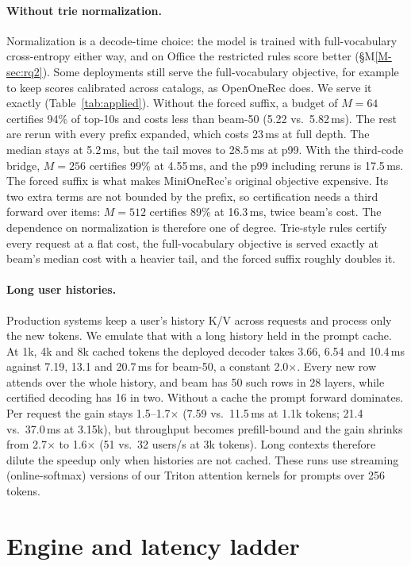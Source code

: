 \documentclass[sigconf,anonymous]{acmart}
\begin{document}
\paragraph{Without trie normalization.} Normalization is a decode-time choice: the model is trained with
full-vocabulary cross-entropy either way, and on Office the restricted rules score better
(\S M\ref{M-sec:rq2}). Some deployments still serve the full-vocabulary objective, for example to keep scores
calibrated across catalogs, as OpenOneRec does. We serve it exactly (Table~\ref{tab:applied}). Without the forced
suffix, a budget of $M=64$ certifies 94\% of top-10s and costs less than beam-50 (5.22 vs.\ 5.82\,ms). The rest are
rerun with every prefix expanded, which costs 23\,ms at full depth. The median stays at 5.2\,ms, but the tail moves
to 28.5\,ms at p99. With the third-code bridge, $M=256$ certifies 99\% at 4.55\,ms, and the p99 including reruns is
17.5\,ms. The forced suffix is what makes MiniOneRec's original objective expensive. Its two extra terms are not
bounded by the prefix, so certification needs a third forward over items: $M=512$ certifies 89\% at 16.3\,ms, twice
beam's cost. The dependence on normalization is therefore one of degree. Trie-style rules certify every request at
a flat cost, the full-vocabulary objective is served exactly at beam's median cost with a heavier tail, and the
forced suffix roughly doubles it.

\paragraph{Long user histories.} Production systems keep a user's history K/V across requests and process only
the new tokens. We emulate that with a long history held in the prompt cache. At 1k, 4k and 8k cached tokens the
deployed decoder takes 3.66, 6.54 and 10.4\,ms against 7.19, 13.1 and 20.7\,ms for beam-50, a constant
2.0$\times$. Every new row attends over the whole history, and beam has 50 such rows in 28 layers, while certified
decoding has 16 in two. Without a cache the prompt forward dominates. Per request the gain stays 1.5--1.7$\times$
(7.59 vs.\ 11.5\,ms at 1.1k tokens; 21.4 vs.\ 37.0\,ms at 3.15k), but throughput becomes prefill-bound and the gain
shrinks from 2.7$\times$ to 1.6$\times$ (51 vs.\ 32 users/s at 3k tokens). Long contexts therefore dilute the
speedup only when histories are not cached. These runs use streaming (online-softmax) versions of our Triton
attention kernels for prompts over 256 tokens.


\section{Engine and latency ladder}
\label{app:engine}
\end{document}
